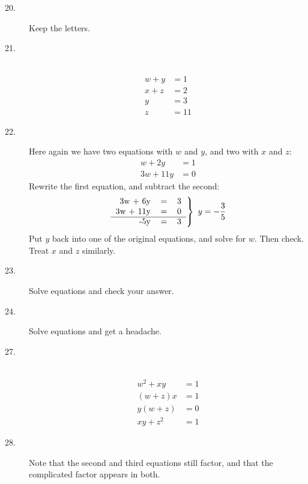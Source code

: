 \documentclass{article}
\begin{document}
\begin{description}

  \item[20.] Keep the letters.

  \item[21.] $\ $
    \begin{align*} 
    w+y & = 1 \\
    x+z & = 2 \\ 
      y & = 3 \\
      z & = 11
    \end{align*}

  \item[22.] Here again we have two equations with $w$ and $y$, and two with $x$ and $z$: 
    \begin{align*}
     w +  2y & = 1 \\ 
    3w + 11y & = 0
    \end{align*}
    Rewrite the first equation, and subtract the second:
    \begin{equation*}
      \left.
      \begin{tabular}{rrr}
        3w +  6y & = & 3 \\
        3w + 11y & = & 0 \\ 
        \cline{1-3}
             -5y & = & 3
      \end{tabular} 
      \right\}
      \ y = - \frac{3}{5}
    \end{equation*}
    Put $y$ back into one of the original equations, and solve for $w$. Then check. Treat $x$ and $z$ similarly. 

  \item[23.] Solve equations and check your answer.

  \item[24.] Solve equations and get a headache.

  \item[27.] $\ $
    \begin{align*}
    w^2 + xy & = 1 \\
     (w+z) x & = 1 \\
     y (w+z) & = 0 \\
    xy + z^2 & = 1
    \end{align*}

  \item[28.] Note that the second and third equations still factor, and that the complicated factor appears in both.

\end{description}
\end{document}
